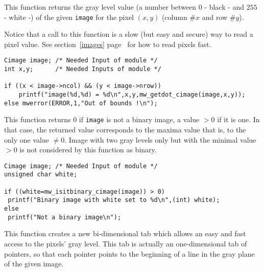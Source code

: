 \newpage %

\Description
This function returns the gray level value (a number between $0$ - black - and $255$ - white -) of the given \verb+image+ for the pixel $(x,y)$ (column $\# x$ and row $\# y$).

Notice that a call to this function is a slow (but easy and secure) way to 
read a pixel value. See section~\ref{images} page~\pageref{images} for how to read pixels fast.

\Next
\Example
\begin{verbatim}
Cimage image; /* Needed Input of module */
int x,y;      /* Needed Inputs of module */

if ((x < image->ncol) && (y < image->nrow))
	printf("image(%d,%d) = %d\n",x,y,mw_getdot_cimage(image,x,y));
else mwerror(ERROR,1,"Out of bounds !\n");

\end{verbatim}

\newpage %

\Description
This function returns $0$ if \verb+image+ is not a binary image, a value $> 0$
if it is one. In that case, the returned value corresponds to the maxima 
value that is, to the only one value $\neq 0$.
Image with two gray levels only but with the minimal value $> 0$ is not 
considered by this function as binary.

\Next
\Example
\begin{verbatim}
Cimage image; /* Needed Input of module */
unsigned char white;

if ((white=mw_isitbinary_cimage(image)) > 0)
 printf("Binary image with white set to %d\n",(int) white);
else 	
 printf("Not a binary image\n");
\end{verbatim}

\newpage %

\Description
This function creates a new bi-dimensional tab which allows an easy and fast
access to the pixels' gray level.
This tab is actually an one-dimensional tab of pointers, so that each pointer 
points to the beginning of a line in the gray plane of the given image.

